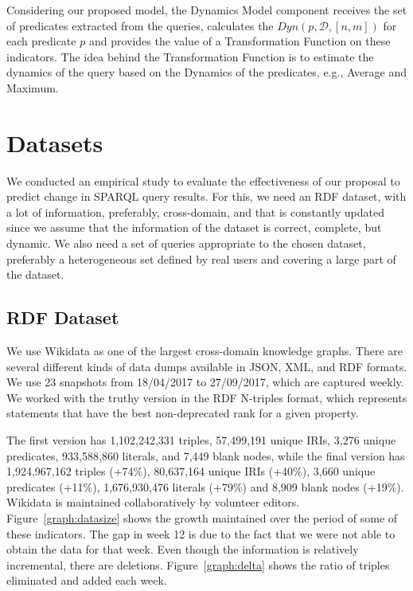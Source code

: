 \documentclass[runningheads]{llncs}
\begin{document}
Considering our proposed model, the Dynamics Model component receives the set of predicates extracted from the queries, calculates the $Dyn(p, \mathcal{D},[n,m])$ for each predicate $p$ and provides the value of a Transformation Function on these indicators. The idea behind the Transformation Function is to estimate the dynamics of the query based on the Dynamics of the predicates, e.g., Average and Maximum.


\section{Datasets}
\label{sec:data}

We conducted an empirical study to evaluate the effectiveness of our proposal to predict change in SPARQL query results. For this, we need an RDF dataset, with a lot of information, preferably, cross-domain, and that is constantly updated since we assume that the information of the dataset is correct, complete, but dynamic. We also need a set of queries appropriate to the chosen dataset, preferably a heterogeneous set defined by real users and covering a large part of the dataset.

\subsection{RDF Dataset}

We use Wikidata as one of the largest cross-domain knowledge graphs. There are several different kinds of data dumps available in JSON, XML, and RDF formats. We use 23 snapshots from 18/04/2017 to 27/09/2017, which are captured weekly. We worked with the truthy version in the RDF N-triples format, which represents statements that have the best non-deprecated rank for a given property.

The first version has 1,102,242,331 triples, 57,499,191 unique IRIs, 3,276 unique predicates, 933,588,860 literals, and 7,449 blank nodes, while the final version has 1,924,967,162 triples (+74\%), 80,637,164 unique IRIs (+40\%), 3,660 unique predicates (+11\%), 1,676,930,476 literals (+79\%) and 8,909 blank nodes (+19\%). Wikidata is maintained collaboratively by volunteer editors. Figure~\ref{graph:datasize} shows the growth maintained over the period of some of these indicators. The gap in week 12 is due to the fact that we were not able to obtain the data for that week. Even though the information is relatively incremental, there are deletions. Figure~\ref{graph:delta} shows the ratio of triples eliminated and added each week.
\end{document}
